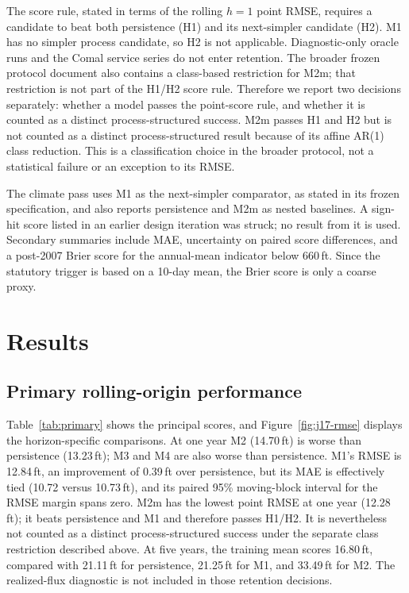 \documentclass[11pt]{article}
\begin{document}
The score rule, stated in terms of the rolling \(h=1\) point RMSE, requires a candidate to beat both persistence (H1) and its next-simpler candidate (H2). M1 has no simpler process candidate, so H2 is not applicable. Diagnostic-only oracle runs and the Comal service series do not enter retention. The broader frozen protocol document also contains a class-based restriction for M2m; that restriction is not part of the H1/H2 score rule. Therefore we report two decisions separately: whether a model passes the point-score rule, and whether it is counted as a distinct process-structured success. M2m passes H1 and H2 but is not counted as a distinct process-structured result because of its affine AR(1) class reduction. This is a classification choice in the broader protocol, not a statistical failure or an exception to its RMSE.

The climate pass uses M1 as the next-simpler comparator, as stated in its frozen specification, and also reports persistence and M2m as nested baselines. A sign-hit score listed in an earlier design iteration was struck; no result from it is used. Secondary summaries include MAE, uncertainty on paired score differences, and a post-2007 Brier score for the annual-mean indicator below 660\,ft. Since the statutory trigger is based on a 10-day mean, the Brier score is only a coarse proxy.

\section{Results}

\subsection{Primary rolling-origin performance}

Table~\ref{tab:primary} shows the principal scores, and Figure~\ref{fig:j17-rmse} displays the horizon-specific comparisons. At one year M2 (14.70\,ft) is worse than persistence (13.23\,ft); M3 and M4 are also worse than persistence. M1's RMSE is 12.84\,ft, an improvement of 0.39\,ft over persistence, but its MAE is effectively tied (10.72 versus 10.73\,ft), and its paired 95\% moving-block interval for the RMSE margin spans zero. M2m has the lowest point RMSE at one year (12.28\,ft); it beats persistence and M1 and therefore passes H1/H2. It is nevertheless not counted as a distinct process-structured success under the separate class restriction described above. At five years, the training mean scores 16.80\,ft, compared with 21.11\,ft for persistence, 21.25\,ft for M1, and 33.49\,ft for M2. The realized-flux diagnostic is not included in those retention decisions.
\end{document}
